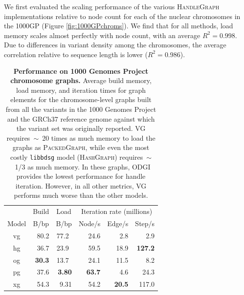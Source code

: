 \documentclass[11pt]{ucthesis}
\begin{document}
We first evaluated the scaling performance of the various \textsc{HandleGraph} implementations relative to node count for each of the nuclear chromosomes in the 1000GP (Figure \ref{fig:1000GPchroms}).
We find that for all methods, load memory scales almost perfectly with node count, with an average $R^2 = 0.998$.
Due to differences in variant density among the chromosomes, the average correlation relative to sequence length is lower ($R^2 = 0.986$).

\begin{table}
\ssp
  \centering
\begin{tabular}{c||r|r|r|r|r}
 & \multicolumn{1}{c|}{Build} & \multicolumn{1}{c|}{Load} & \multicolumn{3}{c}{Iteration rate (millions)} \\
\multicolumn{1}{c||}{Model} & \multicolumn{1}{c|}{B/bp} & \multicolumn{1}{c|}{B/bp} & \multicolumn{1}{c|}{Node/s} & \multicolumn{1}{c|}{Edge/s} & \multicolumn{1}{c}{Step/s} \\
\hline
vg &   80.2 &                77.2$\ \ $  &              24.6 &                  2.8 &               2.9 \\
hg &   36.7 &                23.9$\ \ $  &              59.5 &                 18.9 &              \textbf{127.2} \\
og &   \textbf{30.3}  &   13.7$\ \ $  &              24.1 &                 11.5 &              8.2 \\
pg &   37.6 &                 \textbf{3.80}  &   \textbf{63.7} &   4.6 &                24.3 \\
xg &   54.3 &                9.31  &               54.2 &                 \textbf{20.5} & 117.0 \\
\end{tabular}
\caption{
  \textbf{Performance on 1000 Genomes Project chromosome graphs.}
  Average build memory, load memory, and iteration times for graph elements for the chromosome-level graphs built from all the variants in the 1000 Genomes Project and the GRCh37 reference genome against which the variant set was originally reported.
  \textsc{VG} requires~$\sim$~20 times as much memory to load the graphs as \textsc{PackedGraph}, while even the most costly \texttt{libbdsg} model (\textsc{HashGraph}) requires~$\sim$~1/3 as much memory.
  In these graphs, \textsc{ODGI} provides the lowest performance for handle iteration.
  However, in all other metrics, \textsc{VG} performs much worse than the other models.
}
\label{table:1000GPchroms}
\end{table}
\end{document}
